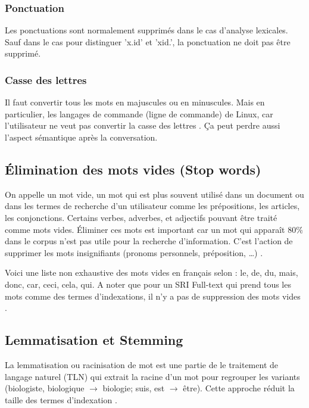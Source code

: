 \subsubsection*{Ponctuation}
Les ponctuations sont normalement supprimés dans le cas d'analyse lexicales. Sauf dans le cas pour distinguer 'x.id' et 'xid.', la ponctuation ne doit pas être supprimé. \citep{modern-ir}

\subsubsection*{Casse des lettres}
Il faut convertir tous les mots en majuscules ou en minuscules. Mais en particulier, les langages de commande (ligne de commande) de Linux, car l'utilisateur ne veut pas convertir la casse des lettres \citep{modern-ir}. Ça peut perdre aussi l'aspect sémantique après la conversation.

\subsection{Élimination des mots vides (Stop words)}
On appelle un mot vide, un mot qui est plus souvent utilisé dans un document ou dans les termes de recherche d'un utilisateur comme les prépositions, les articles, les conjonctions. Certains verbes, adverbes, et adjectifs pouvant être traité comme mots vides. Éliminer ces mots est important car un mot qui apparaît 80\% dans le corpus n'est pas utile pour la recherche d'information. C'est l'action de supprimer les mots insignifiants (pronoms personnels, préposition, \dots) \citep*{modern-ir, approche-semantique, sarch-engine-vsm}.

Voici une liste non exhaustive des mots vides en français selon \citep{stopwords_french}: le, de, du, mais, donc, car, ceci, cela, qui. A noter que pour un SRI Full-text qui prend tous les mots comme des termes d'indexations, il n'y a pas de suppression des mots vides \citep{modern-ir}.

\subsection{Lemmatisation et Stemming}
La lemmatisation ou racinisation de mot est une partie de le traitement de langage naturel (TLN) qui extrait la racine d'un mot pour regrouper les variants (biologiste, biologique $\rightarrow$  biologie; suis, est $\rightarrow$ être). Cette approche réduit la taille des termes d'indexation \citep*{approche-semantique, sarch-engine-vsm}.

